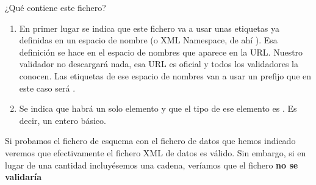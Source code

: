 \documentclass[letterpaper,10pt,spanish]{sphinxmanual}
\begin{document}
¿Qué contiene este fichero?
\begin{enumerate}
\item {} 
En primer lugar se indica que este fichero va a usar unas etiquetas ya definidas en un espacio de nombre (o XML Namespace, de ahí ). Esa definición se hace en el espacio de nombres que aparece en la URL. Nuestro validador no descargará nada, esa URL es oficial y todos los validadores la conocen. Las etiquetas de ese espacio de nombres van a usar un prefijo que en este caso será .

\item {} 
Se indica que habrá un solo elemento y que el tipo de ese elemento es . Es decir, un entero básico.

\end{enumerate}

Si probamos el fichero de esquema con el fichero de datos que hemos indicado veremos que efectivamente el fichero XML de datos es válido. Sin embargo, si en lugar de una cantidad incluyésemos una cadena, veríamos que el fichero \textbf{no se validaría}
\end{document}
